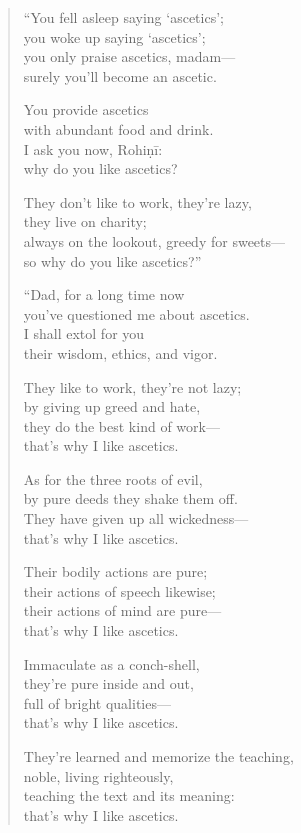 \documentclass[12pt,openany]{book}%
\begin{document}
\begin{verse}%
“You fell asleep saying ‘ascetics’; \\
you woke up saying ‘ascetics’; \\
you only praise ascetics, madam—\\
surely you’ll become an ascetic. 

You provide ascetics \\
with abundant food and drink. \\
I ask you now, \textsanskrit{Rohiṇī}: \\
why do you like ascetics? 

They don’t like to work, they’re lazy, \\
they live on charity; \\
always on the lookout, greedy for sweets—\\
so why do you like ascetics?” 

“Dad, for a long time now \\
you’ve questioned me about ascetics. \\
I shall extol for you \\
their wisdom, ethics, and vigor. 

They like to work, they’re not lazy; \\
by giving up greed and hate, \\
they do the best kind of work—\\
that’s why I like ascetics. 

As for the three roots of evil, \\
by pure deeds they shake them off. \\
They have given up all wickedness—\\
that’s why I like ascetics. 

Their bodily actions are pure; \\
their actions of speech likewise; \\
their actions of mind are pure—\\
that’s why I like ascetics. 

Immaculate as a conch-shell, \\
they’re pure inside and out, \\
full of bright qualities—\\
that’s why I like ascetics. 

They’re learned and memorize the teaching, \\
noble, living righteously, \\
teaching the text and its meaning: \\
that’s why I like ascetics. 


\end{verse}
\end{document}

